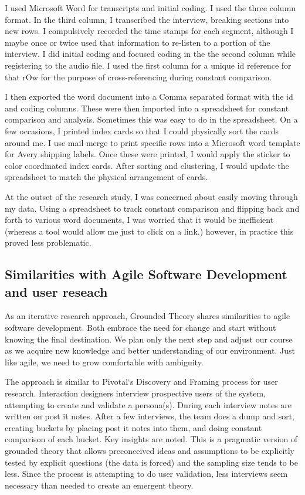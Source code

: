 I used Microsoft Word for transcripts and initial coding. I used the three column format. In the third column, I transcribed the interview, breaking sections into new rows. I compulsively recorded the time stamps for each segment, although  I maybe once or twice used that information to re-listen to a portion of the interview.  I did initial coding and focused coding in the the second column while registering to the audio file. I used the first column for a unique id reference for that rOw for the purpose of cross-referencing during constant comparison. 

I then exported the word document into a Comma separated format with the id and coding columns. These were then imported into a spreadsheet for constant comparison and analysis. Sometimes this was easy to do in the spreadsheet. On a few occasions, I printed index cards so that I could physically sort the cards around me. I use mail merge to print specific rows into a Microsoft word template for Avery shipping labels. Once these were printed, I would apply the sticker to color coordinated index cards. After sorting and clustering, I would update the spreadsheet to match the physical arrangement of cards.

At the outset of the research study, I was concerned about easily moving through my data. Using a spreadsheet to track constant comparison and flipping back and forth to various word documents, I was worried that it would be inefficient (whereas a tool would allow me just to click on a link.) however, in practice this proved less problematic.

\subsection{Similarities with Agile Software Development and user reseach}
As an iterative research approach, Grounded Theory shares similarities to agile software development. Both embrace the need for change and start without knowing the final destination. We plan only the next step and adjust our course as we acquire new knowledge and better understanding of our environment. Just like agile, we need to grow comfortable with ambiguity. 

The approach is similar to Pivotal`s Discovery and Framing process for user research. Interaction designers interview prospective users of the system, attempting to create and validate a persona(s). During each interview notes are written on post it notes. After a few interviews, the team does a dump and sort, creating buckets by placing post it notes into them, and doing constant comparison of each bucket. Key insights are noted. This is a pragmatic version of grounded theory that allows preconceived ideas and assumptions to be explicitly tested by explicit questions (the data is forced) and the sampling size tends to be less. Since the process is attempting to do user validation, less interviews seem necessary than needed to create an emergent theory.



